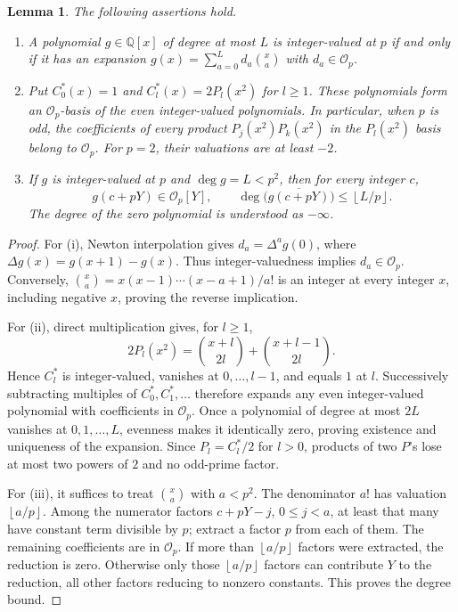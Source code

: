 \documentclass[11pt,letterpaper]{article}
\newtheorem{lemma}[lemma]{Lemma}
\theoremstyle{definition}
\newcommand{\Q}{\mathbb Q}
\newcommand{\floor}[1]{\left\lfloor #1\right\rfloor}
\begin{document}
\begin{lemma}\label{lem:newton-tools}
The following assertions hold.
\begin{enumerate}[label=(\roman*)]
\item A polynomial $g\in\Q[x]$ of degree at most $L$ is integer-valued
at $p$ if and only if it has an expansion
$g(x)=\sum_{a=0}^L d_a\binom{x}{a}$ with $d_a\in\mathcal O_p$.
\item Put $C_0^*(x)=1$ and $C_l^*(x)=2P_l(x^2)$ for $l\ge1$.
These polynomials form an $\mathcal O_p$-basis of the even
integer-valued polynomials. In particular, when $p$ is odd,
the coefficients of every product $P_j(x^2)P_k(x^2)$ in the
$P_l(x^2)$ basis belong to $\mathcal O_p$. For $p=2$, their valuations
are at least $-2$.
\item If $g$ is integer-valued at $p$ and $\deg g=L<p^2$, then for
every integer $c$,
\begin{equation}\label{eq:local-newton}
 g(c+pY)\in\mathcal O_p[Y],\qquad
 \deg\bigl(\overline{g(c+pY)}\bigr)\le\floor{L/p}.
\end{equation}
The degree of the zero polynomial is understood as $-\infty$.
\end{enumerate}
\end{lemma}
\begin{proof}
For (i), Newton interpolation gives
$d_a=\Delta^ag(0)$, where $\Delta g(x)=g(x+1)-g(x)$.
Thus integer-valuedness implies $d_a\in\mathcal O_p$.
Conversely, $\binom{x}{a}=x(x-1)\cdots(x-a+1)/a!$ is an integer at
every integer $x$, including negative $x$, proving the reverse implication.

For (ii), direct multiplication gives, for $l\ge1$,
\begin{equation}\label{eq:central-binomial}
 2P_l(x^2)=\binom{x+l}{2l}+\binom{x+l-1}{2l}.
\end{equation}
Hence $C_l^*$ is integer-valued, vanishes at $0,\ldots,l-1$, and equals
$1$ at $l$. Successively subtracting multiples of $C_0^*,C_1^*,\ldots$
therefore expands any even integer-valued polynomial with coefficients
in $\mathcal O_p$. Once a polynomial of degree at most $2L$ vanishes at
$0,1,\ldots,L$, evenness makes it identically zero, proving existence
and uniqueness of the expansion. Since $P_l=C_l^*/2$ for $l>0$,
products of two $P$'s lose at most two powers of $2$ and no odd-prime
factor.

For (iii), it suffices to treat $\binom{x}{a}$ with $a<p^2$.
The denominator $a!$ has valuation $\floor{a/p}$. Among the numerator
factors $c+pY-j$, $0\le j<a$, at least that many have constant term
divisible by $p$; extract a factor $p$ from each of them. The remaining
coefficients are in $\mathcal O_p$. If more than $\floor{a/p}$ factors
were extracted, the reduction is zero. Otherwise only those
$\floor{a/p}$ factors can contribute $Y$ to the reduction, all other
factors reducing to nonzero constants. This proves the degree bound.
\end{proof}
\end{document}
